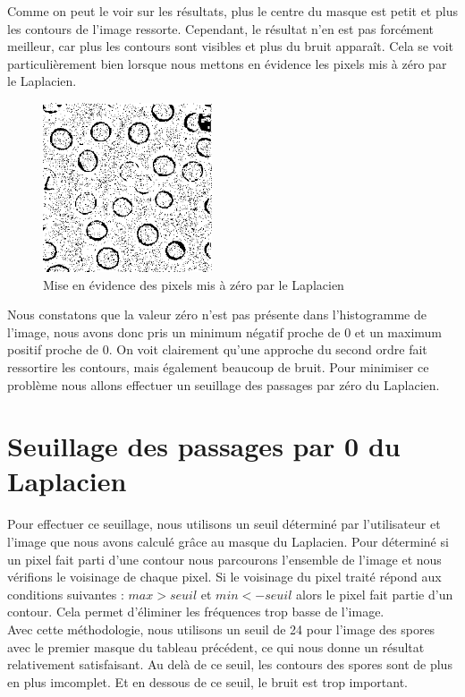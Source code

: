 \documentclass[a4paper,11pt]{article}
\begin{document}
  Comme on peut le voir sur les résultats, plus le centre du masque est petit et plus les contours de l'image ressorte. 
  Cependant, le résultat n'en est pas forcément meilleur, car plus les contours sont visibles et plus du bruit apparaît.
  Cela se voit particulièrement bien lorsque nous mettons en évidence les pixels mis à zéro par le Laplacien.
  
  \begin{figure}[H]
   \center
   \includegraphics[width=5cm]{../laplacien0.png}
   \caption{Mise en évidence des pixels mis à zéro par le Laplacien}
  \end{figure}

  Nous constatons que la valeur zéro n'est pas présente dans l'histogramme de l'image, nous avons donc pris 
  un minimum négatif proche de 0 et un maximum positif proche de 0.
  On voit clairement qu'une approche du second ordre fait ressortire les contours, mais également beaucoup de bruit. 
  Pour minimiser ce problème nous allons effectuer un seuillage des passages par zéro du Laplacien.
  
  \section{Seuillage des passages par 0 du Laplacien}
  Pour effectuer ce seuillage, nous utilisons un seuil déterminé par l'utilisateur et l'image que nous avons
  calculé grâce au masque du Laplacien. Pour déterminé si un pixel fait parti d'une contour nous parcourons l'ensemble de l'image 
  et nous vérifions le voisinage de chaque pixel. Si le voisinage du pixel traité répond aux conditions suivantes : $max > seuil$ et $min < -seuil$
  alors le pixel fait partie d'un contour. Cela permet d'éliminer les fréquences trop basse de l'image.\\ 
  
  Avec cette méthodologie, nous utilisons un seuil de 24 pour l'image des spores avec le premier masque du tableau précédent, ce qui nous donne un résultat relativement
  satisfaisant. Au delà de ce seuil, les contours des spores sont de plus en plus imcomplet. Et en dessous de ce seuil, le bruit est
  trop important.
  
\end{document}

